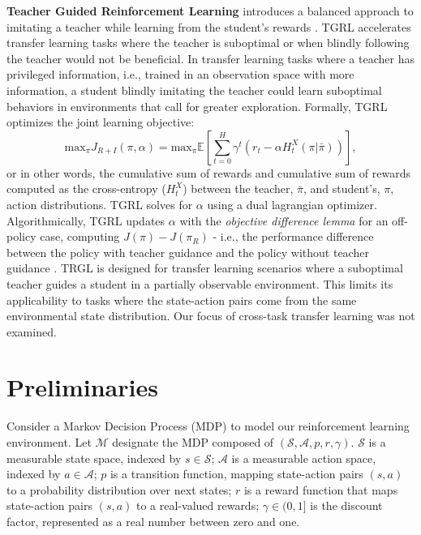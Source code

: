 \documentclass{article} %
\begin{document}
\textbf{Teacher Guided Reinforcement Learning} introduces a balanced approach to imitating a teacher while learning from the student's rewards \citep{shenfeld2023tgrl}. TGRL accelerates transfer learning tasks where the teacher is suboptimal or when blindly following the teacher would not be beneficial. In transfer learning tasks where a teacher has privileged information, i.e., trained in an observation space with more information, a student blindly imitating the teacher could learn suboptimal behaviors in environments that call for greater exploration. Formally, TGRL optimizes the joint learning objective:
\begin{equation}
    \text{max}_{\pi} J_{R+I}(\pi, \alpha) = \text{max}_{\pi} \mathbb{E}[\sum_{t=0}^H \gamma^t(r_t-\alpha H_t^X(\pi|\bar{\pi}))],
\end{equation}
or in other words, the cumulative sum of rewards and cumulative sum of rewards computed as the cross-entropy  ($H_t^X$) between the teacher, $\bar{\pi}$, and student's, $\pi$, action distributions. TGRL solves for $\alpha$ using a dual lagrangian optimizer. Algorithmically, TGRL updates $\alpha$ with the \textit{objective difference lemma} for an off-policy case, computing $J(\pi) - J(\pi_R)$ - i.e., the performance difference between the policy with teacher guidance and the policy without teacher guidance \citep{shenfeld2023tgrl, kakade_approximately_2002, schulman2015trust}. TRGL is designed for transfer learning scenarios where a suboptimal teacher guides a student in a partially observable environment. This limits its applicability to tasks where the state-action pairs come from the same environmental state distribution. Our focus of cross-task transfer learning was not examined. 


\section{Preliminaries}
\label{sec:prelim}

Consider a Markov Decision Process (MDP) to model our reinforcement learning environment. Let $\mathcal{M}$ designate the MDP composed of $(\mathcal{S}, \mathcal{A}, p, r, \gamma)$. $\mathcal{S}$ is a measurable state space, indexed by $s\in \mathcal{S}$; $\mathcal{A}$ is a measurable action space, indexed by $a\in \mathcal{A}$; $p$ is a transition function, mapping state-action pairs $(s, a)$ to a probability distribution over next states; $r$ is a reward function that maps state-action pairs $(s,a)$ to a real-valued rewards; $\gamma \in (0,1]$ is the discount factor, represented as a real number between zero and one. 
\end{document}

